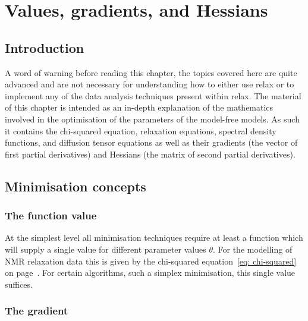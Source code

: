 
\chapter{Values, gradients, and Hessians}




\section{Introduction}


A word of warning before reading this chapter, the topics covered here are quite advanced and are not necessary for understanding how to either use relax or to implement any of the data analysis techniques present within relax.  The material of this chapter is intended as an in-depth explanation of the mathematics involved in the optimisation of the parameters of the model-free models.  As such it contains the chi-squared equation, relaxation equations, spectral density functions, and diffusion tensor equations as well as their gradients (the vector of first partial derivatives) and Hessians (the matrix of second partial derivatives).




\section{Minimisation concepts}

\subsection{The function value}

At the simplest level all minimisation techniques require at least a function which will supply a single value for different parameter values $\theta$.  For the modelling of NMR relaxation data this is given by the chi-squared equation~\eqref{eq: chi-squared} on page~\pageref{eq: chi-squared}.  For certain algorithms, such a simplex minimisation, this single value suffices.


\subsection{The gradient}

